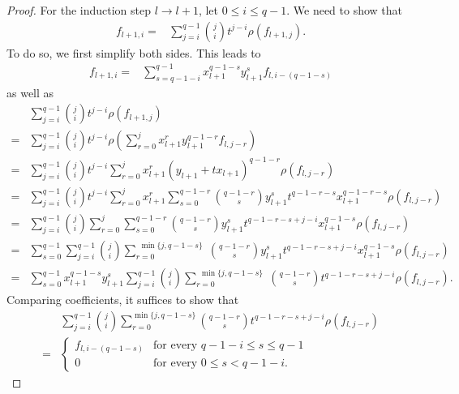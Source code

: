 \documentclass[reqno]{amsart}
\theoremstyle{definition}
\theoremstyle{plain}
\begin{document}
\begin{proof}
For the induction step $l \to l+1$, let $0 \leq i \leq q-1$. We need to show that
\begin{align}
	f_{l+1,i}
	= & \sum_{j=i}^{q-1} 
	\binom{j}{i} t^{j-i}  \rho(f_{l+1, j}). \label{lemma_ind}
\end{align}
To do so, we first simplify both sides. This leads to 
\begin{align*}
	f_{l+1,i}
	= & \sum_{s= q-1-i}^{q-1} x_{l+1}^{q-1-s} y_{l+1}^s f_{l, i-(q-1-s)} 
\end{align*}
as well as
\begin{align*}
	& \sum_{j=i}^{q-1} 
		\binom{j}{i} t^{j-i}  \rho(f_{l+1, j})\\
	= & \sum_{j=i}^{q-1} 
		\binom{j}{i} t^{j-i}  \rho 
		\left(
			\sum_{r= 0}^{j} x_{l+1}^r y_{l+1}^{q-1-r} f_{l, j-r}
		\right) \\
	= & \sum_{j=i}^{q-1} 
		\binom{j}{i} t^{j-i}  
			\sum_{r= 0}^{j} x_{l+1}^r (y_{l+1}+tx_{l+1})^{q-1-r} \rho (f_{l, j-r}) \\	
	= & \sum_{j=i}^{q-1} 
		\binom{j}{i} t^{j-i}  
			\sum_{r= 0}^{j} x_{l+1}^r
				\sum_{s=0}^{q-1-r}
				\binom{q-1-r}{s}
				y_{l+1}^s t^{q-1-r-s} x_{l+1}^{q-1-r-s}
				\rho (f_{l, j-r})
			\\	
	= & \sum_{j=i}^{q-1} 
		\binom{j}{i} 
		\sum_{r= 0}^{j} 
			\sum_{s=0}^{q-1-r}
			\binom{q-1-r}{s}
			y_{l+1}^s t^{q-1-r-s+j-i} x_{l+1}^{q-1-s}
			\rho (f_{l, j-r}) \\
    =  & 
	\sum_{s=0}^{q-1}
		\sum_{j=i}^{q-1}  
			\binom{j}{i} 
			\sum_{r= 0}^{
				\substack{
					\min \{ j,
				 	q-1-s \}}				
			} 
				\binom{q-1-r}{s}
				y_{l+1}^s t^{q-1-r-s+j-i} x_{l+1}^{q-1-s}
				\rho (f_{l, j-r})
	\\
	 = & \sum_{s=0}^{q-1}
		x_{l+1}^{q-1-s} y_{l+1}^s 
		\sum_{j=i}^{q-1} 
			\binom{j}{i} 
			\sum_{r= 0}^{
				\substack{
					\min \{ j,
				 	q-1-s \}}
			} 
				\binom{q-1-r}{s}
				t^{q-1-r-s+j-i}
				\rho (f_{l, j-r}).
\end{align*}
Comparing coefficients, it suffices to show that
\begin{align}
	\nonumber
	&\sum_{j=i}^{q-1} 
		\binom{j}{i} 
		\sum_{r= 0}^{\min \{ j, q-1-s \}} 
			\binom{q-1-r}{s}
			t^{q-1-r-s+j-i} 
		\rho (f_{l, j-r})
	\\
	= &
	\left\{ 
		\begin{array} {cl}
			f_{l, i-(q-1-s)}  & \text{for every } q-1-i \leq s \leq q-1 \\
			0 &\text{for every } 0 \leq s < q-1-i . \label{bed_2} 
		\end{array}

\end{align}
\end{proof}
\end{document}
